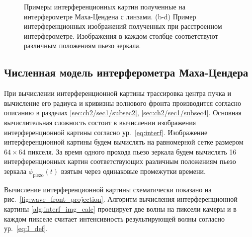 \begin{figure}[ht]
\caption{Примеры интерференционных картин полученные на интерферометре Маха-Цендена с линзами. (b-d) Пример интерференционных изображений полученных при расстроенном интерферометре. Изображения в каждом столбце соответствуют различным положениям пьезо зеркала.}
\label{fig:visib_lens_expl}
\end{figure}

\subsection{Численная модель интерферометра Маха-Цендера}\label{sec:ch2/sec1/subsec6}

При вычислении интерференционной картины трассировка центра пучка и вычисление его радиуса и кривизны волнового фронта производится согласно описанию в разделах \ref{sec:ch2/sec1/subsec2}, \ref{sec:ch2/sec1/subsec4}. Основная вычислительная сложность состоит в вычислении изображения интерференционной картины согласно ур.~\ref{eq:interf}. Изображение интерференционной картины будем вычислять на равномерной сетке размером $64\times64$ пикселя. За время одного прохода пьезо зеркала будем вычислять 16 интерференционных картин соответствующих различным положениям пьезо зеркала $\phi_{\mathrm{piezo}}(t)$ взятым через одинаковые промежутки времени. 

Вычисление интерференционной картины схематически показано на рис.~\ref{fig:wave_front_projection}. Алгоритм вычисления интерференционной картины \ref{alg:interf_img_calc} проецирует две волны на пиксели камеры и в каждом пикселе считает интенсивность результирующей волны согласно ур.~\ref{eq:I_def}. 

